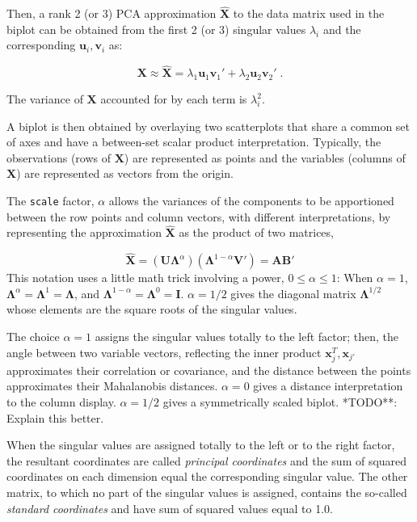 \documentclass[
  letterpaper,
  10pt,
  krantz2]{krantz}
\begin{document}
Then, a rank 2 (or 3) PCA approximation \(\widehat{\mathbf{X}}\) to the
data matrix used in the biplot can be obtained from the first 2 (or 3)
singular values \(\lambda_i\) and the corresponding
\(\mathbf{u}_i, \mathbf{v}_i\) as:

\[
\mathbf{X} \approx \widehat{\mathbf{X}} = \lambda_1 \mathbf{u}_1 \mathbf{v}_1' + \lambda_2 \mathbf{u}_2 \mathbf{v}_2' \; .
\]

The variance of \(\mathbf{X}\) accounted for by each term is
\(\lambda_i^2\).

A biplot is then obtained by overlaying two scatterplots that share a
common set of axes and have a between-set scalar product interpretation.
Typically, the observations (rows of \(\mathbf{X}\)) are represented as
points and the variables (columns of \(\mathbf{X}\)) are represented as
vectors from the origin.

The \texttt{scale} factor, \(\alpha\) allows the variances of the
components to be apportioned between the row points and column vectors,
with different interpretations, by representing the approximation
\(\widehat{\mathbf{X}}\) as the product of two matrices,

\[
\widehat{\mathbf{X}} = (\mathbf{U} \mathbf{\Lambda}^\alpha) (\mathbf{\Lambda}^{1-\alpha} \mathbf{V}') = \mathbf{A} \mathbf{B}'
\] This notation uses a little math trick involving a power,
\(0 \le \alpha \le 1\): When \(\alpha = 1\),
\(\mathbf{\Lambda}^\alpha = \mathbf{\Lambda}^1 =\mathbf{\Lambda}\), and
\(\mathbf{\Lambda}^{1-\alpha} = \mathbf{\Lambda}^0 =\mathbf{I}\).
\(\alpha = 1/2\) gives the diagonal matrix \(\mathbf{\Lambda}^{1/2}\)
whose elements are the square roots of the singular values.

The choice \(\alpha = 1\) assigns the singular values totally to the
left factor; then, the angle between two variable vectors, reflecting
the inner product \(\mathbf{x}_j^T, \mathbf{x}_{j'}\) approximates their
correlation or covariance, and the distance between the points
approximates their Mahalanobis distances. \(\alpha = 0\) gives a
distance interpretation to the column display. \(\alpha = 1/2\) gives a
symmetrically scaled biplot. *TODO**: Explain this better.

When the singular values are assigned totally to the left or to the
right factor, the resultant coordinates are called \emph{principal
coordinates} and the sum of squared coordinates on each dimension equal
the corresponding singular value. The other matrix, to which no part of
the singular values is assigned, contains the so-called \emph{standard
coordinates} and have sum of squared values equal to 1.0.
\end{document}
